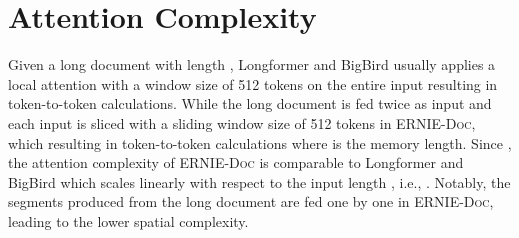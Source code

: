 \documentclass[11pt,a4paper]{article}
\newcommand{\mname}{\textsc{ERNIE-Doc}\xspace}
\begin{document}
\section{Attention Complexity}
Given a long document with length , Longformer and BigBird usually applies a local attention with a window size of 512 tokens on the entire input resulting in  token-to-token calculations. While the long document is fed twice as input and each input is sliced with a sliding window size of 512 tokens in \mname, which resulting in  token-to-token calculations where  is the memory length. Since , the attention complexity of \mname is comparable to Longformer and BigBird which scales linearly with respect to the input length , i.e., . Notably, the segments produced from the long document are fed one by one in \mname, leading to the lower spatial complexity.
\end{document}

